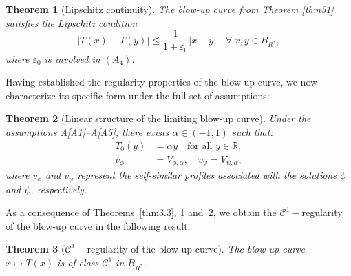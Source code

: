 \documentclass[
  sn-mathphys-num,
  colorlinks,
  linkcolor=darkmagenta,
  citecolor=rufous,
  urlcolor=zaffre,
  hypertexnames=false
]{sn-jnl}
\numberwithin{equation}{section}
\newtheorem{theorem}{Theorem}[section]%
\begin{document}
\begin{theorem}[Lipschitz continuity]
\label{thm3.2}
The blow-up curve from Theorem \ref{thm31} satisfies the Lipschitz condition
\begin{equation}\label{eq:3.15}
|T(x) - T(y)| \leq \frac{1}{1+\varepsilon_0}|x-y| \quad \forall \ x,y \in B_{R^*},
\end{equation}
where $\varepsilon_0$ is involved in $(A_4)$.
\end{theorem}
Having established the regularity properties of the blow-up curve, we now characterize its specific form under the full set of assumptions:

\begin{theorem}[Linear structure of the limiting blow-up curve]
\label{th:3.6}
Under the assumptions A\ref{A1}--A\ref{A5}, there exists $\alpha \in (-1,1)$ such that:
\begin{align}
T_0(y) &= \alpha y \quad \text{for all } y \in \mathbb{R}, \label{eq:5.4} \\
v_\phi &= V_{\phi,\alpha}, \quad v_\psi = V_{\psi,\alpha}, \label{eq:5.5}
\end{align}
where $v_\phi$ and $v_\psi$ represent the self-similar profiles associated with the solutions $\phi$ and $\psi$,  respectively.
\end{theorem}
As a consequence of Theorems~\ref{thm3.3}, \ref{thm3.2} and~\ref{th:3.6}, we obtain the $\mathcal{C}^1-$regularity of the blow-up curve in the following result.
\begin{theorem}[$\mathcal{C}^1-$regularity of the blow-up curve]
\label{thm3.4}
The blow-up curve $x \mapsto T(x)$ is of class $\mathcal{C}^1$ in $B_{R^*}$.
\end{theorem}
\end{document}

